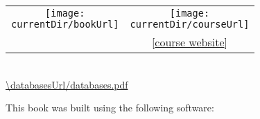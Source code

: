 %
\clearpage%
%
\strut\vfill\strut%
%
\begin{center}%
\noindent\begin{tabular}{c@{~~~~~~~~~~~~}c}%
\texttt{[image: \\currentDir/bookUrl]}&\texttt{[image: \\currentDir/courseUrl]}\\\relax%
[\expandafter\href{\databasesUrl/databases.pdf}{book pdf}]&[\expandafter\href{\databasesUrl}{course website}]\\%
\end{tabular}\\[12pt]%
\noindent\expandafter\url{\databasesUrl/databases.pdf}%
\end{center}%
%
\strut\vfill\strut%
This book was built using the following software:%
%
